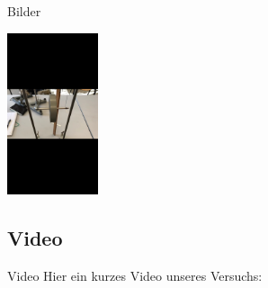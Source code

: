 \begin{frame}{Bilder}
    \begin{center}
        \includegraphics[width=0.2\textwidth]{build/Bild2.jpg} %
    \end{center}
\end{frame}

\subsection{Video}
\begin{frame}{Video}
    Hier ein kurzes Video unseres Versuchs:
    \begin{center}
    \end{center}
\end{frame}
